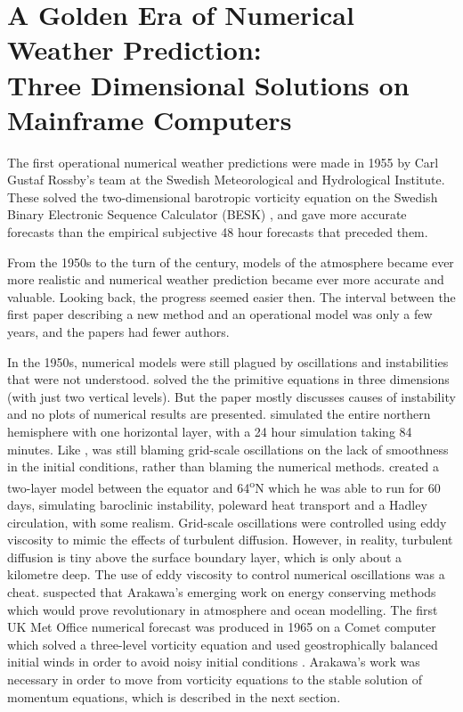 \section[A Golden Era of Numerical Weather Prediction]{A Golden Era of Numerical Weather Prediction: \protect \\
{\normalsize Three Dimensional Solutions on Mainframe Computers}{\normalsize\textmd{
}}}

The first operational numerical weather predictions were made in 1955
by Carl Gustaf Rossby's team at the Swedish Meteorological and Hydrological
Institute. These solved the two-dimensional barotropic vorticity equation
on the Swedish Binary Electronic Sequence Calculator (BESK) \citep{Pers05a},
and gave more accurate forecasts than the empirical subjective 48
hour forecasts that preceded them.

From the 1950s to the turn of the century, models of the atmosphere
became ever more realistic and numerical weather prediction became
ever more accurate and valuable. Looking back, the progress seemed
easier then. The interval between the first paper describing a new
method and an operational model was only a few years, and the papers
had fewer authors.

In the 1950s, numerical models were still plagued by oscillations
and instabilities that were not understood. \citet{Smag58} solved
the the primitive equations in three dimensions (with just two vertical
levels). But the paper mostly discusses causes of instability and
no plots of numerical results are presented. \citet{Phil59} simulated
the entire northern hemisphere with one horizontal layer, with a 24
hour simulation taking 84 minutes. Like \citet{Rich22}, \citet{Phil59}
was still blaming grid-scale oscillations on the lack of smoothness
in the initial conditions, rather than blaming the numerical methods.
\citet{Smag63} created a two-layer model between the equator and
64\textsuperscript{o}N which he was able to run for 60 days, simulating
baroclinic instability, poleward heat transport and a Hadley circulation,
with some realism. Grid-scale oscillations were controlled using eddy
viscosity to mimic the effects of turbulent diffusion. However, in
reality, turbulent diffusion is tiny above the surface boundary layer,
which is only about a kilometre deep. The use of eddy viscosity to
control numerical oscillations was a cheat. \citet{Smag63} suspected
that Arakawa's emerging work on energy conserving methods which would
prove revolutionary in atmosphere and ocean modelling. The first UK
Met Office numerical forecast was produced in 1965 on a Comet computer
\citep{Pers05c,MOhistory26} which solved a three-level vorticity
equation and used geostrophically balanced initial winds in order
to avoid noisy initial conditions \citep{BW61}. Arakawa's work was
necessary in order to move from vorticity equations to the stable
solution of momentum equations, which is described in the next section.

